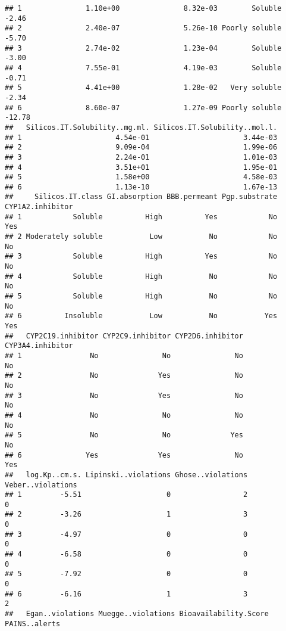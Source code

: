 \documentclass[
]{article}
\begin{document}
\begin{verbatim}
## 1               1.10e+00               8.32e-03        Soluble            -2.46
## 2               2.40e-07               5.26e-10 Poorly soluble            -5.70
## 3               2.74e-02               1.23e-04        Soluble            -3.00
## 4               7.55e-01               4.19e-03        Soluble            -0.71
## 5               4.41e+00               1.28e-02   Very soluble            -2.34
## 6               8.60e-07               1.27e-09 Poorly soluble           -12.78
##   Silicos.IT.Solubility..mg.ml. Silicos.IT.Solubility..mol.l.
## 1                      4.54e-01                      3.44e-03
## 2                      9.09e-04                      1.99e-06
## 3                      2.24e-01                      1.01e-03
## 4                      3.51e+01                      1.95e-01
## 5                      1.58e+00                      4.58e-03
## 6                      1.13e-10                      1.67e-13
##     Silicos.IT.class GI.absorption BBB.permeant Pgp.substrate CYP1A2.inhibitor
## 1            Soluble          High          Yes            No              Yes
## 2 Moderately soluble           Low           No            No               No
## 3            Soluble          High          Yes            No               No
## 4            Soluble          High           No            No               No
## 5            Soluble          High           No            No               No
## 6          Insoluble           Low           No           Yes              Yes
##   CYP2C19.inhibitor CYP2C9.inhibitor CYP2D6.inhibitor CYP3A4.inhibitor
## 1                No               No               No               No
## 2                No              Yes               No               No
## 3                No              Yes               No               No
## 4                No               No               No               No
## 5                No               No              Yes               No
## 6               Yes              Yes               No              Yes
##   log.Kp..cm.s. Lipinski..violations Ghose..violations Veber..violations
## 1         -5.51                    0                 2                 0
## 2         -3.26                    1                 3                 0
## 3         -4.97                    0                 0                 0
## 4         -6.58                    0                 0                 0
## 5         -7.92                    0                 0                 0
## 6         -6.16                    1                 3                 2
##   Egan..violations Muegge..violations Bioavailability.Score PAINS..alerts

\end{verbatim}
\end{document}
